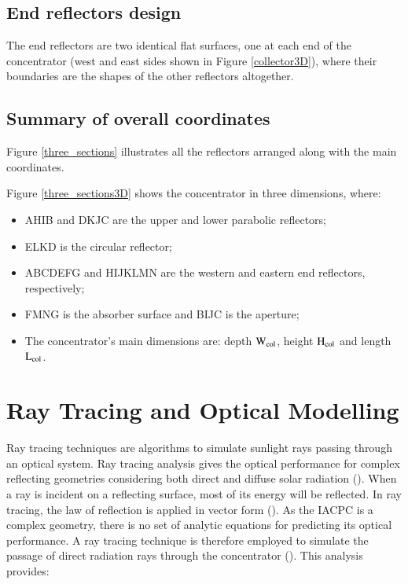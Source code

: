 \subsection{End reflectors design}

The end reflectors are two identical flat surfaces, one at each end of the concentrator (west and east sides shown in Figure \ref{collector3D}), where their boundaries are the shapes of the other reflectors altogether.

\subsection{Summary of overall coordinates}

Figure \ref{three_sections} illustrates all the reflectors arranged along with the main coordinates.


Figure \ref{three_sections3D} shows the concentrator in three dimensions, where:

\begin{itemize}[topsep=5pt,partopsep=0pt] \itemsep0pt
\item AHIB and DKJC are the upper and lower parabolic reflectors;
\item ELKD is the circular reflector;
\item ABCDEFG and HIJKLMN are the western and eastern end reflectors, respectively;
\item FMNG is the absorber surface and BIJC is the aperture;
\item The concentrator’s main dimensions are: depth $\rm{W_{col}}$, height $\rm{H_{col}}$ and length $\rm{L_{col}}$.
\end{itemize}


\section{Ray Tracing and Optical Modelling}

Ray tracing techniques are algorithms to simulate sunlight rays passing through an optical system. Ray tracing analysis gives the optical performance for complex reflecting geometries considering both direct and diffuse solar radiation (\cite{Ali2013}). When a ray is incident on a reflecting surface, most of its energy will be reflected. In ray tracing, the law of reflection is applied in vector form (\cite{Winston2005}). As the IACPC is a complex geometry, there is no set of analytic equations for predicting its optical performance. A ray tracing technique is therefore employed to simulate the passage of direct radiation rays through the concentrator (\cite{Ali2013}). This analysis provides:

